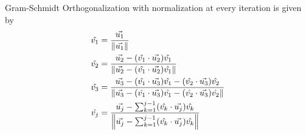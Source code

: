 \begin{defn}
\label{GSorth_norm}
Gram-Schmidt Orthogonalization with normalization at every iteration is given by
\begin{align*}
\hat{v_1} &= \frac{\vec{u_1}}{\norm{\vec{u_1}}} \\
\hat{v_2} &= \frac{\vec{u_2} - (\hat{v_1} \cdot \vec{u_2})\hat{v_1}}{\norm{\vec{u_2} - (\hat{v_1} \cdot \vec{u_2})\hat{v_1}}} \\
\hat{v_3} &= \frac{\vec{u_3} - (\hat{v_1} \cdot \vec{u_3})\hat{v_1} - (\hat{v_2} \cdot \vec{u_3})\hat{v_2}}{\norm{\vec{u_3} - (\hat{v_1} \cdot \vec{u_3})\hat{v_1} - (\hat{v_2} \cdot \vec{u_3})\hat{v_2}}} \\
\hat{v_j} &= \frac{\vec{u_j} - \sum_{k=1}^{j-1}(\hat{v_k} \cdot \vec{u_j})\hat{v_k}}{\norm{\vec{u_j} - \sum_{k=1}^{j-1}(\hat{v_k} \cdot \vec{u_j})\hat{v_k}}}
\end{align*}
\end{defn}

